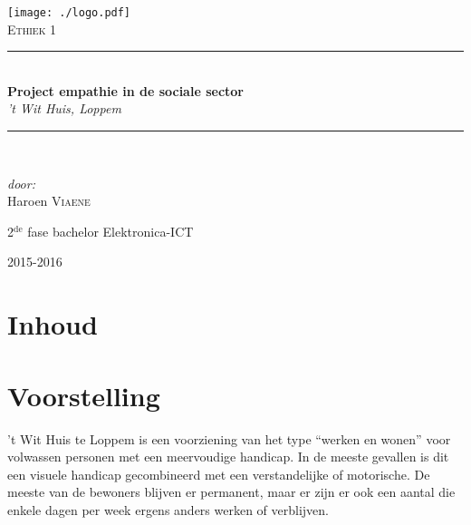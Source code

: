\documentclass[a4paper,12pt]{article}
\newcommand{\HRule}{\rule{\linewidth}{0.5mm}}
\begin{document}
\begin{titlepage}
\begin{center}
\texttt{[image: ./logo.pdf]}~\\[1cm]


\textsc{\Large Ethiek 1}\\[0.5cm]

\HRule \\[0.4cm]
{ \LARGE \bfseries Project empathie in de sociale sector}\\[0.4cm]
{\large \emph{'t Wit Huis, Loppem}}\\[0.2cm]

\HRule \\[1.5cm]

\begin{minipage}{0.4\textwidth}
\begin{flushleft} \large
\emph{door:}\\
Haroen \textsc{Viaene}\\

\end{flushleft}
\end{minipage}
\begin{minipage}{0.4\textwidth}
\begin{flushright} \large
\large{2$^{\text{de}}$ fase bachelor Elektronica-ICT}\\
\end{flushright}
\end{minipage}

\vfill

{\large 2015-2016}

\end{center}
\end{titlepage}

\newpage

\section*{Inhoud}

\tableofcontents

\newpage

\section{Voorstelling}


’t Wit Huis te Loppem is een voorziening van het type ``werken en wonen'' voor volwassen personen met een meervoudige handicap. In de meeste gevallen is dit een visuele handicap gecombineerd met een verstandelijke of motorische. De meeste van de bewoners blijven er permanent, maar er zijn er ook een aantal die enkele dagen per week ergens anders werken of verblijven.
\end{document}
